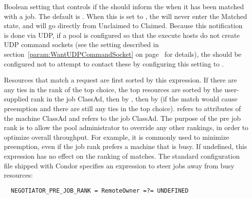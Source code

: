 \begin{description}
\label{param:NegotiatorInformStartd}
\item[\Macro{NEGOTIATOR\_INFORM\_STARTD}]
  Boolean setting that controls if the  should
  inform the  when it has been matched with a job.
  The default is .
  When this is set to , the  will never
  enter the Matched state, and will go directly from Unclaimed to
  Claimed.
  Because this notification is done via UDP, if a pool is configured
  so that the execute hosts do not create UDP command sockets (see the
   setting described in
  section~\ref{param:WantUDPCommandSocket} on
  page~\pageref{param:WantUDPCommandSocket} for details), the
   should be configured not to attempt to contact
  these  by configuring this setting to .

\label{param:NegotiatorPreJobRank}
\item[\Macro{NEGOTIATOR\_PRE\_JOB\_RANK}]
  Resources that match a request
  are first sorted by this expression.  If there are any ties in the
  rank of the top choice, the top resources are sorted by the
  user-supplied rank in the job ClassAd, then by
  , then by
   (if the match would cause preemption and
  there are still any ties in the top choice).  \verb@MY@ refers to
  attributes of the machine ClassAd and \verb@TARGET@ refers to the
  job ClassAd.  The purpose of the pre job rank is to allow the pool
  administrator to override any other rankings, in order to optimize
  overall throughput.  For example, it is commonly used to minimize
  preemption, even if the job rank prefers a machine that is busy.  If
  undefined, this expression has no effect on the ranking of matches.
  The standard configuration file shipped with Condor specifies an
  expression to steer jobs away from busy resources:

\begin{verbatim}
  NEGOTIATOR_PRE_JOB_RANK = RemoteOwner =?= UNDEFINED
\end{verbatim}


\end{description}
